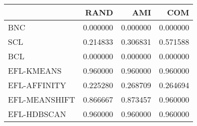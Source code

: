 \begin{tabular}{lrrr}
\toprule
 & RAND & AMI & COM \\
\midrule
BNC & 0.000000 & 0.000000 & 0.000000 \\
SCL & 0.214833 & 0.306831 & 0.571588 \\
BCL & 0.000000 & 0.000000 & 0.000000 \\
EFL-KMEANS & 0.960000 & 0.960000 & 0.960000 \\
EFL-AFFINITY & 0.225280 & 0.268709 & 0.264694 \\
EFL-MEANSHIFT & 0.866667 & 0.873457 & 0.960000 \\
EFL-HDBSCAN & 0.960000 & 0.960000 & 0.960000 \\
\bottomrule
\end{tabular}
